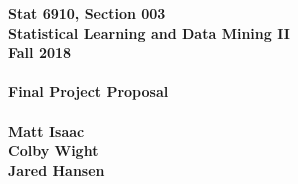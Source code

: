 \documentclass[12pt,letterpaper,final]{article}
\begin{document}
















\begin{titlepage}
\vspace*{4.5cm}
\begin{center}
{\LARGE \bf Stat 6910, Section 003} \\[0.5cm]
{\LARGE \bf Statistical Learning and Data Mining II} \\[0.5cm]
{\LARGE \bf Fall 2018} \\[0.5cm]
~ \\[2cm]
{\LARGE \bf Final Project Proposal} \\[0.5cm]
~ \\[2cm]
{\LARGE \bf Matt Isaac} \\[0.4cm]
{\LARGE \bf Colby Wight} \\[0.4cm]
{\LARGE \bf Jared Hansen} \\[0.4cm]
\end{center}

\thispagestyle{empty}
\vfill
\end{titlepage}

\newpage
\end{document}
